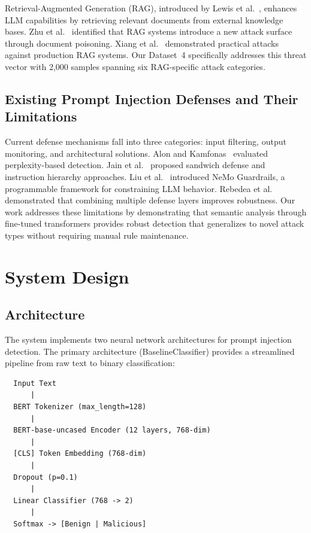 \documentclass[11pt]{article}
\begin{document}
Retrieval-Augmented Generation (RAG), introduced by Lewis et al.~\cite{lewis2020rag}, enhances LLM capabilities by retrieving relevant documents from external knowledge bases. Zhu et al.~\cite{zhu2023promptbench} identified that RAG systems introduce a new attack surface through document poisoning. Xiang et al.~\cite{xiang2024poisonedrag} demonstrated practical attacks against production RAG systems. Our Dataset~4 specifically addresses this threat vector with 2,000 samples spanning six RAG-specific attack categories.

\subsection{Existing Prompt Injection Defenses and Their Limitations}

Current defense mechanisms fall into three categories: input filtering, output monitoring, and architectural solutions. Alon and Kamfonas~\cite{alon2023detecting} evaluated perplexity-based detection. Jain et al.~\cite{jain2023baseline} proposed sandwich defense and instruction hierarchy approaches. Liu et al.~\cite{liu2023nemo} introduced NeMo Guardrails, a programmable framework for constraining LLM behavior. Rebedea et al.~\cite{rebedea2023nemo} demonstrated that combining multiple defense layers improves robustness. Our work addresses these limitations by demonstrating that semantic analysis through fine-tuned transformers provides robust detection that generalizes to novel attack types without requiring manual rule maintenance.

\section{System Design}
\label{sec:design}

\subsection{Architecture}

The system implements two neural network architectures for prompt injection detection. The primary architecture (BaselineClassifier) provides a streamlined pipeline from raw text to binary classification:

\begin{verbatim}
  Input Text
      |
  BERT Tokenizer (max_length=128)
      |
  BERT-base-uncased Encoder (12 layers, 768-dim)
      |
  [CLS] Token Embedding (768-dim)
      |
  Dropout (p=0.1)
      |
  Linear Classifier (768 -> 2)
      |
  Softmax -> [Benign | Malicious]
\end{verbatim}
\end{document}
